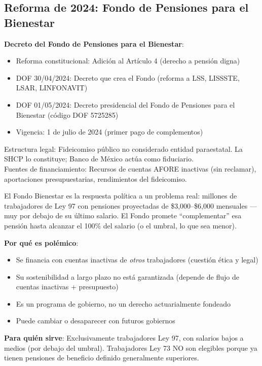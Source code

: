 \documentclass[11pt,a4paper]{report}
\begin{document}
\subsection{Reforma de 2024: Fondo de Pensiones para el Bienestar}

\begin{tcolorbox}[colback=blue!5!white, colframe=blue!75!black, title=\textbf{Definici\'on Formal}]
\textbf{Decreto del Fondo de Pensiones para el Bienestar}:\\
\begin{itemize}[nosep]
\item Reforma constitucional: Adici\'on al Art\'iculo 4 (derecho a pensi\'on digna)
\item DOF 30/04/2024: Decreto que crea el Fondo (reforma a LSS, LISSSTE, LSAR, LINFONAVIT)
\item DOF 01/05/2024: Decreto presidencial del Fondo de Pensiones para el Bienestar (c\'odigo DOF 5725285)
\item Vigencia: 1 de julio de 2024 (primer pago de complementos)
\end{itemize}
Estructura legal: Fideicomiso p\'ublico no considerado entidad paraestatal. La SHCP lo constituye; Banco de M\'exico act\'ua como fiduciario.\\[0.3em]
Fuentes de financiamiento: Recursos de cuentas AFORE inactivas (sin reclamar), aportaciones presupuestarias, rendimientos del fideicomiso.
\end{tcolorbox}

\begin{tcolorbox}[colback=green!5!white, colframe=green!50!black, title=\textbf{Intuici\'on}]
El Fondo Bienestar es la respuesta pol\'itica a un problema real: millones de trabajadores de Ley 97 con pensiones proyectadas de \$3,000--\$6,000 mensuales ---muy por debajo de su \'ultimo salario. El Fondo promete ``complementar'' esa pensi\'on hasta alcanzar el 100\% del salario (o el umbral, lo que sea menor).

\textbf{Por qu\'e es pol\'emico}:
\begin{itemize}[nosep]
\item Se financia con cuentas inactivas de \emph{otros} trabajadores (cuesti\'on \'etica y legal)
\item Su sostenibilidad a largo plazo no est\'a garantizada (depende de flujo de cuentas inactivas + presupuesto)
\item Es un programa de gobierno, no un derecho actuarialmente fondeado
\item Puede cambiar o desaparecer con futuros gobiernos
\end{itemize}

\textbf{Para qui\'en sirve}: Exclusivamente trabajadores Ley 97, con salarios bajos a medios (por debajo del umbral). Trabajadores Ley 73 NO son elegibles porque ya tienen pensiones de beneficio definido generalmente superiores.
\end{tcolorbox}
\end{document}
